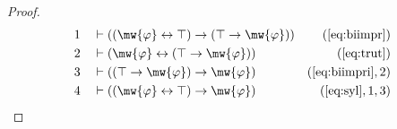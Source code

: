 \begin{proof}
\begin{align}
  1 &&  & \vdash ( ( \mw{\varphi} \leftrightarrow \top ) \rightarrow ( \top
     \rightarrow \mw{\varphi} )
     )&(\mbox{\ref{eq:biimpr}})\notag
  \\ 2 &&  & \vdash ( \mw{\varphi} \leftrightarrow ( \top \rightarrow
     \mw{\varphi} ) )&(\mbox{\ref{eq:trut}})\notag
  \\ 3 &&  & \vdash ( ( \top \rightarrow \mw{\varphi} ) \rightarrow
     \mw{\varphi} )&(\mbox{\ref{eq:biimpri}},2)\notag
  \\ 4 &&  & \vdash ( ( \mw{\varphi} \leftrightarrow \top ) \rightarrow
     \mw{\varphi} )&(\mbox{\ref{eq:syl}},1,3)\notag
\end{align}
\end{proof}


